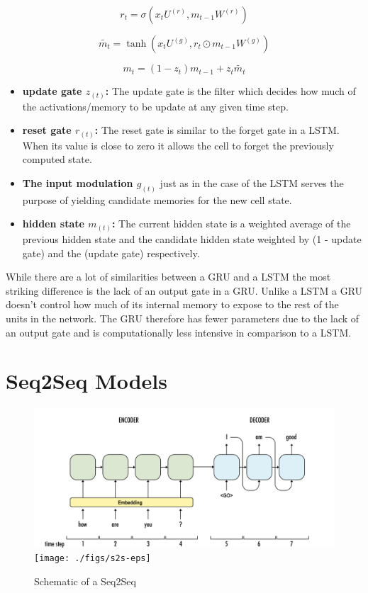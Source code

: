 \begin{equation}
r_t= \sigma(x_t U^{(r)}, m_{t-1}W^{(r)})
\end{equation}

\begin{equation}
\widetilde {m_t}= \tanh(x_t U^{(g)},r_t \odot m_{t-1}W^{(g)})
\end{equation}

\begin{equation}
m_t= (1-z_t)m_{t-1} + z_t\widetilde{m_t} %
\end{equation}

\begin{itemize}
	\item \textbf{update gate $z_{(t)}$:} The update gate is the filter which decides how much of the activations/memory to be update at any given time step.
	\item \textbf{reset gate $r_{(t)}$:} The reset gate is similar to the forget gate in a LSTM. When its value is close to zero it allows the cell to forget the previously computed state.
	\item \textbf{The input modulation $g_{(t)}$} just as in the case of the LSTM  serves the purpose of yielding candidate memories for the new cell state.
	\item \textbf{hidden state $m_{(t)}$:} The current hidden state is a weighted average of the previous hidden state and the candidate hidden state weighted by (1 - update gate) and the (update gate) respectively.
\end{itemize}


While there are a lot of similarities between a GRU and a LSTM the most striking difference is the lack of an output gate in a GRU. Unlike a LSTM a GRU doesn't control how much of its internal memory to expose to the rest of the units in the network. The GRU therefore has fewer parameters due to the lack of an output gate and is computationally less intensive in comparison to a LSTM.

\section{Seq2Seq Models}\label{background:s2s}
\begin{figure}
	\begin{minipage}[t]{\textwidth}
		\ifpdf
		\includegraphics[width=\linewidth,keepaspectratio=true]{./figs/s2s-pdf}
		\else
		\texttt{[image: ./figs/s2s-eps]}
		\fi
		\caption{Schematic of a Seq2Seq \citep{manish}}
		\label{bck:s2s}
	\end{minipage}
\end{figure}

